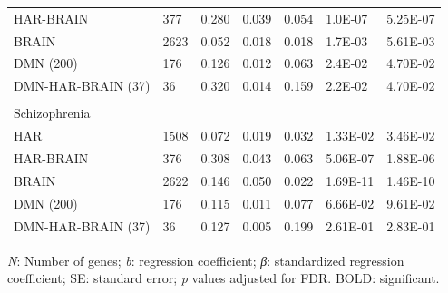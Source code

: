 \begin{refsection}
\begin{table}[H]
\begin{tabular}{@{}lllllll@{}}
HAR-BRAIN                         & 377  & 0.280   & 0.039  & 0.054 & 1.0E-07  & 5.25E-07   \\
BRAIN                             & 2623 & 0.052  & 0.018  & 0.018 & 1.7E-03  & 5.61E-03   \\
DMN (200)                         & 176  & 0.126  & 0.012  & 0.063 & 2.4E-02  & 4.70E-02   \\
DMN-HAR-BRAIN (37)                & 36   & 0.320   & 0.014  & 0.159 & 2.2E-02  & 4.70E-02   \\
                                  &      &        &        &       &          &            \\
Schizophrenia                     &      &        &        &       &          &            \\
HAR                               & 1508 & 0.072  & 0.019  & 0.032 & 1.33E-02 & 3.46E-02   \\
HAR-BRAIN                         & 376  & 0.308  & 0.043  & 0.063 & 5.06E-07 & 1.88E-06   \\
BRAIN                             & 2622 & 0.146  & 0.050  & 0.022 & 1.69E-11 & 1.46E-10   \\
DMN (200)                         & 176  & 0.115  & 0.011  & 0.077 & 6.66E-02 & 9.61E-02   \\
DMN-HAR-BRAIN (37)                & 36   & 0.127  & 0.005  & 0.199 & 2.61E-01 & 2.83E-01   \\ \hline
\end{tabular}
{\begin{flushleft}
\scriptsize \textit{N}: Number of genes; \textit{b}: regression coefficient; \textit{β}: standardized regression coefficient; SE: standard error; \textit{p} values adjusted for FDR. BOLD: significant.
\end{flushleft}}
\end{table}



\end{refsection}
